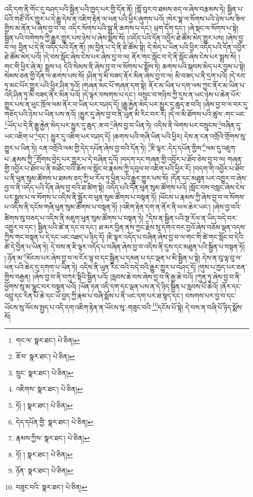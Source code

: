 འདི་དག་ནི་གོང་དུ་བཤད་པའི་སྦྱིན་པའི་ཁྱད་པར་གྱི་དོན་ནོ། །གློ་བུར་བ་ཐམས་ཅད་ལ་ཞེས་བརྩམས་ཏེ། སྦྱིན་པ་པོའི་གཙོ་བོར་གྱུར་པ་དེ་རྒྱུ་དེས་ན་འཇིག་རྟེན་ལ་ཕན་པའི་ཕྱིར་ཞུགས་པའོ། །སེར་སྣ་ལ་སོགས་པའི་ཉེས་པས་ཟིལ་གྱིས་མ་ནོན་པ་ཞེས་བྱ་བ་ལ། འདིར་སོགས་པའི་སྒྲ་ནི་ཆགས་པ་དང་། ཕྲག་དོག་དང་། །ཞེ་སྡང་ལ་སོགས་པ་སྟེ། སྦྱིན་པའི་བགེགས་ཀྱི་རྒྱུར་གྱུར་པས་ཉེས་པ་ཞེས་སྨོས་སོ། །འདོད་པའི་དོན་འབྱོར་ཐེ་ཚོམ་མེད་གྱུར་པས། །ཞེས་བྱ་བ་ལ། བྱིན་པ་དེ་ནི་འདོད་པའི་དོན་ནོ། །མ་བྱིན་པ་དེ་ནི་ཐེ་ཚོམ་སྟེ། དེ་མེད་པ་ཡིན་པའི་ཕྱིར་འདོད་པའི་དོན་འབྱོར་ཐེ་ཚོམ་མེད་པའོ། །དེ་བས་སློང་ཞེས་ངེས་པར་ཞེས་བྱ་བ་ལ། ནོར་གང་སློང་བ་དེ་ནི་སློང་ཞེས་ངེས་པར་སྨྲས་སོ། །གང་གི་ཕྱིར་ཞེ་ན། སྨྲས་པ། དེའི་སེམས་ནི་ཞེས་བྱ་བ་ལ་སོགས་པ་སྨོས་ཏེ། ཆགས་པའི་སྐབས་མེད་པར་བྱས་པ་སྟེ། སེམས་ཅན་གྱི་དོན་ལ་ཆགས་པས་སོ། །ཤིན་ཏུ་མི་བཟད་ནོར་མིན་ཞེས་བྱ་བ་ལ། མི་བཟད་པ་ནི་དྲག་པའོ། །དེ་རབ་ཏུ་མང་པོར་གྱུར་པའི་ཕྱིར་ཤིན་ཏུའོ། །གཞན་མང་པོ་གཞན་དག་སྟེ། ནོར་མ་ཡིན་པ་དག་ལས་ཀྱང་ནོར་མ་ཡིན་པ་འདི་ཤིན་ཏུ་མི་བཟད་ནོར་མིན་པའོ། །དེ་ལྟར་བསགས་པ་དང་། བསྲུང་བ་གཉིས་ཀྱི་དུས་ན་ཡང་ཉེས་པ་ཆེན་པོར་གྱུར་པས་ན་ཕུང་ཁྲོལ་ལམ་ནོར་བ་ཡིན་པར་བཤད་དོ། །རྒྱུ་རྐྱེན་མེད་པར་མྱུར་དུ་ཆུད་ཟ་བའི། །ཞེས་བྱ་བ་ལ་བར་དུ་གཅོད་པའི་ཉེས་པ་ཡིན་པས་ནའོ། །མྱུར་དུ་ཞེས་བྱ་བ་ནི་ཡུན་མི་རིང་བར་རོ། །དེ་ལ་མི་ཐོགས་པའི་ཚུལ་:གང་ཡང་\footnote{གང་ལ་  སྣར་ཐང་།  པེ་ཅིན། }ཡོད་པ་དེ་ནི་རྒྱུ་རྐྱེན་མེད་པར་མྱུར་དུ་ཆུད་:ཟ་བ་\footnote{ཟོ་བ་  སྣར་ཐང་།  པེ་ཅིན། }ཞེས་བྱ་བ་ཡིན་ཏེ། འདིས་ནི་ལེགས་པར་བསྲུངས་\footnote{སྲུང་  སྣར་ཐང་།  པེ་ཅིན། }བཞིན་དུ་ཡང་འཇིག་པ་\footnote{འཇིགས་  སྣར་ཐང་།  པེ་ཅིན། }དང་། མྱུར་དུ་འཇིག་པར་བཤད་དོ། །ཆགས་པའི་གཞི་ཡིན་པའི་ཕྱིར། དེས་ན་ངན་འགྲོའི་གྲོགས་སུ་གྱུར་པ་ཡིན་ཏེ། ངན་འགྲོའི་ལམ་གྱི་དེད་དཔོན་ཞེས་བྱ་བའི་དོན་ཏེ། \footnote{ཏོ། །   སྣར་ཐང་།  པེ་ཅིན། }ཇི་ལྟར་:དེད་དཔོན་གྱིས་\footnote{དེད་དཔོན་གྱི་  སྣར་ཐང་།  པེ་ཅིན། }ལམ་དུ་འཇུག་པ་:རྣམས་ཀྱི་\footnote{རྣམས་ཀྱིས་  སྣར་ཐང་།  པེ་ཅིན། }གྲོགས་བྱེད་པར་གྱུར་པ་དེ་བཞིན་དུའོ། །བདག་དང་གཞན་གྱི་འབྱོར་པ་ཐོབ་ཅེས་བྱ་བ་ལ། གཞན་གྱི་འབྱོར་པ་ཐོབ་པ་ནི་མཐོང་བའི་ཆོས་ལ་སློང་བ་རྣམས་ཀྱི་དབུལ་བ་འཇིག་པའི་ཕྱིར་རོ། །བདག་གི་འབྱོར་པ་ཐོབ་པ་ནི་ཕུན་སུམ་ཚོགས་པ་ཐམས་ཅད་ཀྱི་ཕ་རོལ་ཏུ་ཕྱིན་པའི་རྒྱུར་གྱུར་པས་སོ། །དོན་དང་མཐུན་པར་འགྱུར་བ་ཞེས་བྱ་བ་ནི་འདོད་པའི་དོན་ཞེས་བྱ་བའི་ཐ་ཚིག་སྟེ། འདོད་པའི་དོན་ཕུན་སུམ་ཚོགས་པའོ། །སློང་བས་བསླང་ཞེས་ངེས་པར་སྨྲས་པ་ལ་སོགས་པ་འདིས་ནི་སྦྱོར་བ་ཕུན་སུམ་ཚོགས་པ་བསྟན་ཏོ། །ཕོངས་པ་རྣམས་ཀྱི་ཞེས་བྱ་བ་ལ་སོགས་པ་འདིས་ནི་དངོས་གཞི་ཕུན་སུམ་ཚོགས་པ་བསྟན་ཏོ། །འཇིག་རྟེན་དག་ན་ནོར་ནི་ཕལ་ཆེར་ཡང་། །ཞེས་བྱ་བའི་ཚིགས་སུ་བཅད་པ་འདིས་ནི་མཇུག་ཕུན་སུམ་ཚོགས་པ་བསྟན་ཏེ། \footnote{ཏོ། །   སྣར་ཐང་།  པེ་ཅིན། }དེས་ན་སྦྱིན་པའི་སྔ་རོལ་ན་ཡིད་བདེ་བར་འགྱུར་བ་དང་། སྦྱིན་པའི་ཚེ་ན་དང་བ་དང་། ཐ་མར་བྱིན་ནས་ཀྱང་རྗེས་སུ་དགའ་བར་བྱའོ་ཞེས་བཅོམ་ལྡན་འདས་ཀྱིས་གང་བསྟན་པ་དེ་དང་ཡང་འཐད་པ་ཉིད་དོ། །ཇི་ལྟར་འདོད་པ་བཞིན་ཞེས་བྱ་བ་ལ་གང་གི་ཚེ་གང་སློང་བ་དེའི་ཚེ་དེ་བྱིན་པ་ཡིན་ཏེ། དེ་བས་ན་ཇི་ལྟར་འདོད་པ་བཞིན་ཞེས་བྱ་བ་འདིས་ནི་དུས་དང་མཐུན་པའི་སྦྱིན་པ་བསྟན་ཏོ། །:ཉོན་མ་\footnote{ཉོན་  སྣར་ཐང་།  པེ་ཅིན། }མོངས་པར་ཞེས་བྱ་བ་ལ་ངོར་ལྟ་བ་དང་སྦྱིན་པ་དམན་པ་དང་ལྡན་པ་མི་སྦྱིན་པ་སྟེ། དེས་ན་བུ་ལྟ་བུ་ལ་ཕན་པའི་ཆེད་དུ་དགག་པ་ཡིན་ཏེ། འདིས་ནི་ཡུན་རིང་བའི་བདེ་བའི་རྒྱུར་གྱུར་པ་བཤད་དོ། །གུས་པ་ཁྱད་པར་ཅན་གྱིས་བརྒྱན། །ཞེས་བྱ་བ་ནི་བཀུར་སྟིའི་སྦྱིན་པའོ། །རླབས་ཆེ་བས་ཞེས་བྱ་བ་ནི་རྒྱ་ཆེ་བའོ། །ཀུན་ཏུ་ཞེས་བྱ་བ་ནི་ཕྱོགས་སུ་མ་ལྷུང་བར་བསྟན་པའོ། །ཡོན་ཏན་འདི་དག་དང་ལྡན་པས་ན་དེ་ཉིད་སྦྱིན་པ་རླབས་པོ་ཆེའོ། །ནོར་དང་འབྲུ་དང་རིན་པོ་ཆེ་དང་ཡོ་བྱད་ཀྱི་རྣམ་པ་བཞི་སྨོས་པ་ནི་ཡང་དག་པར་ཐ་སྙད་དང་། བསགས་པར་བྱ་བ་དང་ཡོངས་སུ་ལོངས་སྤྱད་པ་འདི་དག་འཇིག་རྟེན་ན་ཡོངས་སུ་:གཟུང་བའི་\footnote{བཟུང་བའི་  སྣར་ཐང་།  པེ་ཅིན། }དངོས་པོ་སྟེ། དེ་བས་ན་བཞི་པོ་ཉིད་སྨོས་སོ། 